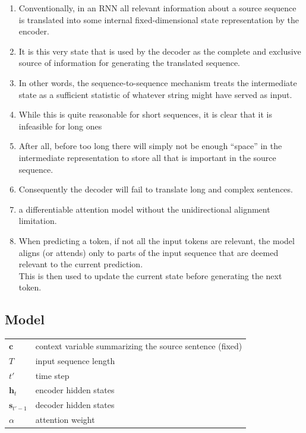 \begin{enumerate}
    \item Conventionally, in an RNN all relevant information about a source sequence is translated into some internal fixed-dimensional state representation by the encoder. 
    
    \item It is this very state that is used by the decoder as the complete and exclusive source of information for generating the translated sequence. 
    
    \item In other words, the sequence-to-sequence mechanism treats the intermediate state as a sufficient statistic of whatever string might have served as input.

    \item While this is quite reasonable for short sequences, it is clear that it is infeasible for long ones

    \item After all, before too long there will simply not be enough “space” in the intermediate representation to store all that is important in the source sequence.
    
    \item Consequently the decoder will fail to translate long and complex sentences.

    \item a differentiable attention model without the unidirectional alignment limitation. 
    
    \item When predicting a token, if not all the input tokens are relevant, the model aligns (or attends) only to parts of the input sequence that are deemed relevant to the current prediction. \\
    This is then used to update the current state before generating the next token.

    
\end{enumerate}


\subsection*{Model \cite{dnn-1}}

\begin{customTableWrapper}{1.5}
\begin{longtable}{l p{8cm}}
    $\mathbf{c}$ & context variable summarizing the source sentence (fixed) \\

    $T$ & input sequence length \\

    $t'$ & time step \\

    $\mathbf{h}_{t}$ & encoder hidden states \\

    $\mathbf{s}_{t'-1}$ & decoder hidden states \\

    $\alpha$ & attention weight \\

\end{longtable}
\end{customTableWrapper}

